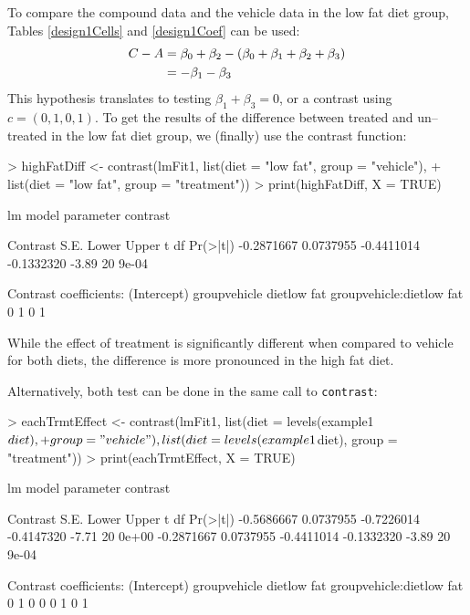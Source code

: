 \documentclass[12pt]{article}
\begin{document}
To compare the compound data and the vehicle data in the low fat diet group, Tables \ref{design1Cells} and \ref{design1Coef} can be used:
\begin{align}
C - A &= 	\beta_0 + \beta_2 -(\beta_0+\beta_1+\beta_2+\beta_{3}) \notag \\
	&= -\beta_1 - \beta_{3} \notag
\end{align}
This hypothesis translates to testing $\beta_1 + \beta_{3} = 0$, or a contrast using $c=(0, 1, 0, 1)$. To get the results of the difference between treated and un--treated in the low fat diet group, we (finally) use the contrast function:
{\small 
\begin{Schunk}
\begin{Sinput}
> highFatDiff <- contrast(lmFit1, list(diet = "low fat", group = "vehicle"), 
+     list(diet = "low fat", group = "treatment"))
> print(highFatDiff, X = TRUE)
\end{Sinput}
\begin{Soutput}
lm model parameter contrast

   Contrast      S.E.      Lower      Upper     t df Pr(>|t|)
 -0.2871667 0.0737955 -0.4411014 -0.1332320 -3.89 20    9e-04

Contrast coefficients:
 (Intercept) groupvehicle dietlow fat groupvehicle:dietlow fat
           0            1           0                        1
\end{Soutput}
\end{Schunk}
}
While the effect of treatment is significantly different when compared to vehicle for both diets, the difference is more pronounced in the high fat diet.

Alternatively, both test can be done in the same call to \texttt{contrast}:

{\small
\begin{Schunk}
\begin{Sinput}
> eachTrmtEffect <- contrast(lmFit1, list(diet = levels(example1$diet), 
+     group = "vehicle"), list(diet = levels(example1$diet), group = "treatment"))
> print(eachTrmtEffect, X = TRUE)
\end{Sinput}
\begin{Soutput}
lm model parameter contrast

   Contrast      S.E.      Lower      Upper     t df Pr(>|t|)
 -0.5686667 0.0737955 -0.7226014 -0.4147320 -7.71 20    0e+00
 -0.2871667 0.0737955 -0.4411014 -0.1332320 -3.89 20    9e-04

Contrast coefficients:
 (Intercept) groupvehicle dietlow fat groupvehicle:dietlow fat
           0            1           0                        0
           0            1           0                        1
\end{Soutput}
\end{Schunk}
}
\end{document}
